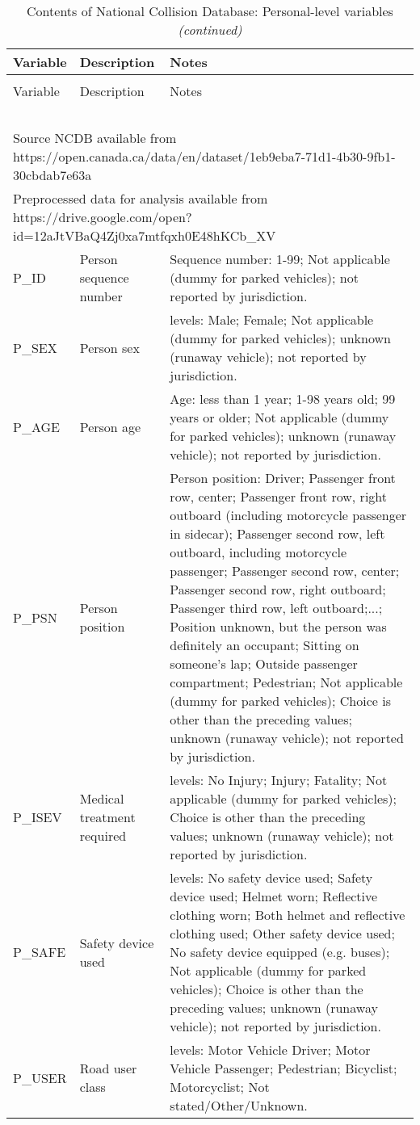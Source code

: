 \documentclass[]{elsarticle} %
\begin{document}
\begin{longtable}[t]{ll>{\raggedright\arraybackslash}p{32em}}
\caption{\label{tab:ncdb-descriptives-person}\label{tab:ncdb-descriptives-person}Contents of National Collision Database: Personal-level variables}\\
\toprule
Variable & Description & Notes\\
\midrule
\endfirsthead
\caption[]{\label{tab:ncdb-descriptives-person}Contents of National Collision Database: Personal-level variables \textit{(continued)}}\\
\toprule
Variable & Description & Notes\\
\midrule
\endhead
\
\endfoot
\bottomrule
\multicolumn{3}{l}{\textit{Note: }}\\
\multicolumn{3}{l}{Source NCDB available from https://open.canada.ca/data/en/dataset/1eb9eba7-71d1-4b30-9fb1-30cbdab7e63a}\\
\multicolumn{3}{l}{Preprocessed data for analysis available from https://drive.google.com/open?id=12aJtVBaQ4Zj0xa7mtfqxh0E48hKCb\_XV}\\
\endlastfoot
\rowcolor{gray!6}  P\_ID & Person sequence number & Sequence number: 1-99; Not applicable (dummy for parked vehicles); not reported by jurisdiction.\\
P\_SEX & Person sex & 5 levels: Male; Female; Not applicable (dummy for parked vehicles); unknown (runaway vehicle); not reported by jurisdiction.\\
\rowcolor{gray!6}  P\_AGE & Person age & Age: less than 1 year; 1-98 years old; 99 years or older; Not applicable (dummy for parked vehicles); unknown (runaway vehicle); not reported by jurisdiction.\\
P\_PSN & Person position & Person position: Driver; Passenger front row, center; Passenger front row, right outboard (including motorcycle passenger in sidecar); Passenger second row, left outboard, including motorcycle passenger; Passenger second row, center; Passenger second row, right outboard; Passenger third row, left outboard;...; Position unknown, but the person was definitely an occupant; Sitting on someone’s lap; Outside passenger compartment; Pedestrian; Not applicable (dummy for parked vehicles); Choice is other than the preceding values; unknown (runaway vehicle); not reported by jurisdiction.\\
\rowcolor{gray!6}  P\_ISEV & Medical treatment required & 6 levels: No Injury; Injury; Fatality; Not applicable (dummy for parked vehicles); Choice is other than the preceding values; unknown (runaway vehicle); not reported by jurisdiction.\\
\addlinespace
P\_SAFE & Safety device used & 11 levels: No safety device used; Safety device used; Helmet worn; Reflective clothing worn; Both helmet and reflective clothing used; Other safety device used; No safety device equipped   (e.g. buses); Not applicable (dummy for parked vehicles); Choice is other than the preceding values; unknown (runaway vehicle); not reported by jurisdiction.\\
\rowcolor{gray!6}  P\_USER & Road user class & 6 levels: Motor Vehicle Driver; Motor Vehicle Passenger; Pedestrian; Bicyclist; Motorcyclist; Not stated/Other/Unknown.\\*
\end{longtable}
\end{document}
